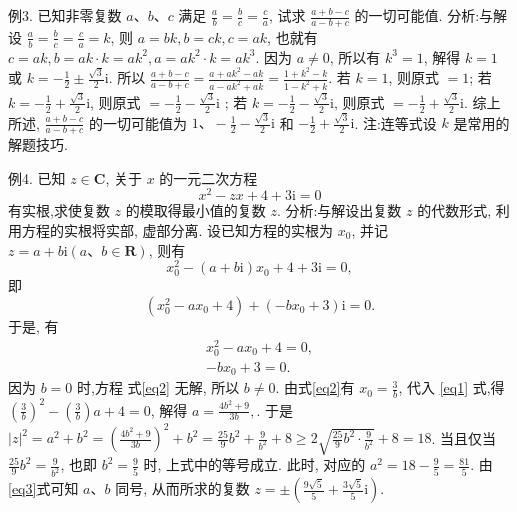 例3. 已知非零复数 $a 、 b 、 c$ 满足 $\frac{a}{b}=\frac{b}{c}=\frac{c}{a}$, 试求 $\frac{a+b-c}{a-b+c}$ 的一切可能值.
分析:与解设 $\frac{a}{b}=\frac{b}{c}=\frac{c}{a}=k$, 则 $a=b k, b=c k, c=a k$, 也就有 $c= a k, b=a k \cdot k=a k^2, a=a k^2 \cdot k=a k^3$. 因为 $a \neq 0$, 所以有 $k^3=1$, 解得 $k=1$ 或 $k=-\frac{1}{2} \pm \frac{\sqrt{3}}{2} \mathrm{i}$.
所以 $\frac{a+b-c}{a-b+c}=\frac{a+a k^2-a k}{a-a k^2+a k}=\frac{1+k^2-k}{1-k^2+k}$.
若 $k=1$, 则原式 $=1$;
若 $k=-\frac{1}{2}+\frac{\sqrt{3}}{2} \mathrm{i}$, 则原式 $=-\frac{1}{2}-\frac{\sqrt{3}}{2} \mathrm{i}$ ;
若 $k=-\frac{1}{2}-\frac{\sqrt{3}}{2} \mathrm{i}$, 则原式 $=-\frac{1}{2}+\frac{\sqrt{3}}{2} \mathrm{i}$.
综上所述, $\frac{a+b-c}{a-b+c}$ 的一切可能值为 $1 、-\frac{1}{2}-\frac{\sqrt{3}}{2} \mathrm{i}$ 和 $-\frac{1}{2}+\frac{\sqrt{3}}{2} \mathrm{i}$.
注:连等式设 $k$ 是常用的解题技巧.



例4. 已知 $z \in \mathbf{C}$, 关于 $x$ 的一元二次方程
$$
x^2-z x+4+3 \mathrm{i}=0
$$
有实根,求使复数 $z$ 的模取得最小值的复数 $z$.
分析:与解设出复数 $z$ 的代数形式, 利用方程的实根将实部, 虚部分离.
设已知方程的实根为 $x_0$, 并记 $z=a+b \mathrm{i}(a 、 b \in \mathbf{R})$, 则有
$$
x_0^2-(a+b \mathrm{i}) x_0+4+3 \mathrm{i}=0,
$$
即
$$
\left(x_0^2-a x_0+4\right)+\left(-b x_0+3\right) \mathrm{i}=0 .
$$
于是, 有
$$
\begin{gathered}
x_0^2-a x_0+4=0, \label{eq1} \\
-b x_0+3=0 . \label{eq2}
\end{gathered}
$$
因为 $b=0$ 时,方程 式\ref{eq2} 无解, 所以 $b \neq 0$.
由式\ref{eq2}有 $x_0=\frac{3}{b}$, 代入 \ref{eq1} 式,得 $\left(\frac{3}{b}\right)^2-\left(\frac{3}{b}\right) a+4=0$, 解得 $a=\frac{4 b^2+9}{3 b}, \label{eq3}$.
于是 $|z|^2=a^2+b^2=\left(\frac{4 b^2+9}{3 b}\right)^2+b^2=\frac{25}{9} b^2+\frac{9}{b^2}+8 \geqslant 2 \sqrt{\frac{25}{9} b^2 \cdot \frac{9}{b^2}}+ 8=18$.
当且仅当 $\frac{25}{9} b^2=\frac{9}{b^2}$, 也即 $b^2=\frac{9}{5}$ 时, 上式中的等号成立.
此时, 对应的 $a^2=18-\frac{9}{5}=\frac{81}{5}$.
由\ref{eq3}式可知 $a 、 b$ 同号, 从而所求的复数 $z= \pm\left(\frac{9 \sqrt{5}}{5}+\frac{3 \sqrt{5}}{5} \mathrm{i}\right)$.



